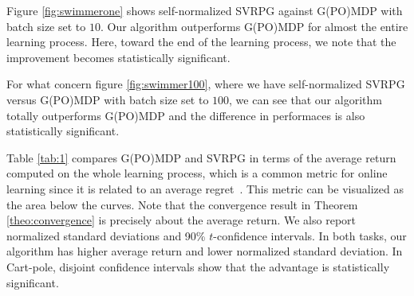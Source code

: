 Figure \ref{fig:swimmerone} shows self-normalized \acs{SVRPG} against G(PO)MDP with batch size set to $10$. Our algorithm outperforms G(PO)MDP for almost the entire learning process. Here, toward the end of the learning process, we note that the improvement becomes statistically significant.

For what concern figure \ref{fig:swimmer100}, where we have self-normalized \acs{SVRPG} versus G(PO)MDP with batch size set to $100$, we can see that our algorithm totally outperforms G(PO)MDP and the difference in performaces is also statistically significant.

Table \ref{tab:1} compares G(PO)MDP and \acs{SVRPG} in terms of the average return computed on the whole learning process, which is a common metric for online learning since it is related to an average regret~\citep[\eg][]{duan2016benchmarking}. This metric can be visualized as the area below the curves. Note that the convergence result in Theorem \ref{theo:convergence} is precisely about the average return. We also report normalized standard deviations and 90\% $t$-confidence intervals.
In both tasks, our algorithm has higher average return and lower normalized standard deviation.
In Cart-pole, disjoint confidence intervals show that the advantage is statistically significant.

